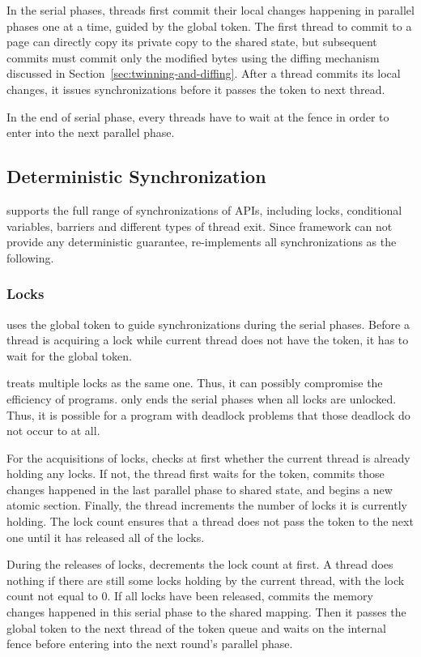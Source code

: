 In the serial phases, threads first commit their local changes happening in parallel phases one at a time, guided by the global token.  The first thread to commit to a page can directly copy its private copy to the shared state, but subsequent commits must commit only the modified bytes using the diffing mechanism discussed in Section~\ref{sec:twinning-and-diffing}.  After a thread commits its local changes, it issues synchronizations before it passes the token to next thread. 

In the end of serial phase, every threads have to wait at the fence in order to enter into the next parallel phase. 

\subsection{Deterministic Synchronization}
\label{sec:synchronization}
\dthreads{} supports the full range of synchronizations of
\pthreads{} APIs, including locks, conditional variables, barriers and different types of thread exit. Since \sheriff{} framework can not provide any deterministic guarantee, \dthreads{} re-implements all synchronizations as the following.

\subsubsection{Locks}
\dthreads{} uses the global token to guide synchronizations during the serial phases. Before a thread is acquiring a lock while current thread does not have the token, it has to wait for the global token. 

\dthreads{} treats multiple locks as the same one. Thus, it can possibly compromise the efficiency of programs. \dthreads{} only ends the serial phases when all locks are unlocked. Thus, it is possible for a program with deadlock problems that those deadlock do not occur to \dthreads{} at all. 

For the acquisitions of locks, \dthreads{} checks at first 
whether the current thread is already holding any locks. If not, the thread first waits for the token, commits those changes happened in the last parallel phase to shared state, and begins a new atomic section. Finally, the thread increments the number of locks it is currently holding. The lock count ensures that a thread does not pass the token to the next one until it has released all of the locks.

During the releases of locks, \dthreads{} decrements the lock count at first. A thread does nothing if there are still some locks holding by the current thread, with the lock count not equal to 0. If all locks have been released, \dthreads{} commits the memory changes happened in this serial phase to the shared mapping. Then it passes the global token to the next thread of the token queue and waits on the internal fence before entering into the next round's parallel phase.

